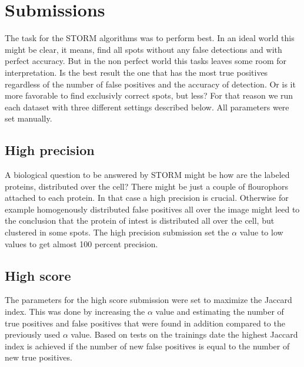 \section{Submissions}
The task for the STORM algorithms was to perform best. In an ideal world this might be clear, it means, find all spots without any false detections and with perfect accuracy. But in the non perfect world this tasks leaves some room for interpretation. Is the best result the one that has the most true positives regardless of the number of false positives and the accuracy of detection. Or is it more favorable to find exclusivly correct spots, but less?\newline
For that reason we run each dataset with three different settings described below. All parameters were set manually.
\subsection{High precision}
A biological question to be answered by STORM might be how are the labeled proteins, distributed over the cell? There might be just a couple of flourophors attached to each protein. In that case a high precision is crucial. Otherwise for example homogenously distributed false positives all over the image might leed to the conclusion that the protein of intest is distributed all over the cell, but clustered in some spots.\newline
The high precision submission set the $\alpha$ value to low values to get almost 100 percent precision.
\subsection{High score}
The parameters for the high score submission were set to maximize the Jaccard index. This was done by increasing the $\alpha$ value and estimating the number of true positives and false positives that were found in addition compared to the previously used $\alpha$ value. Based on tests on the trainings date the highest Jaccard index is achieved if the number of new false positives is equal to the number of new true positives. 
